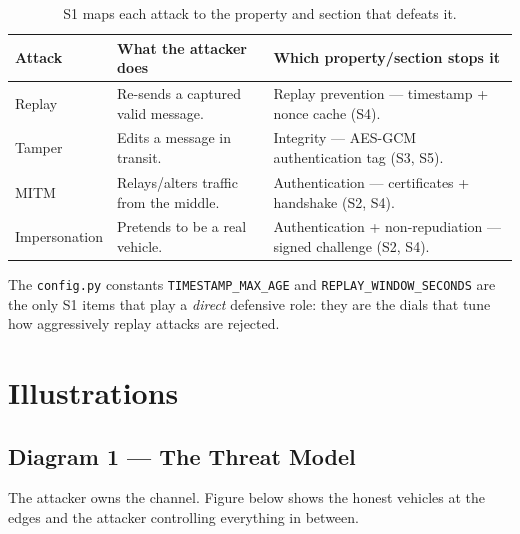 \documentclass[11pt,a4paper]{article}
\begin{document}
\begin{table}[h]
\centering
\small
\begin{tabular}{@{}p{2.6cm} p{5.6cm} p{5.3cm}@{}}
\toprule
\textbf{Attack} & \textbf{What the attacker does} & \textbf{Which property/section stops it}\\
\midrule
Replay & Re-sends a captured valid message. &
Replay prevention --- timestamp + nonce cache (S4).\\
Tamper & Edits a message in transit. &
Integrity --- AES-GCM authentication tag (S3, S5).\\
MITM & Relays/alters traffic from the middle. &
Authentication --- certificates + handshake (S2, S4).\\
Impersonation & Pretends to be a real vehicle. &
Authentication + non-repudiation --- signed challenge (S2, S4).\\
\bottomrule
\end{tabular}
\caption{S1 maps each attack to the property and section that defeats it.}
\end{table}

\noindent The \texttt{config.py} constants \texttt{TIMESTAMP\_MAX\_AGE} and
\texttt{REPLAY\_WINDOW\_SECONDS} are the only S1 items that play a \emph{direct}
defensive role: they are the dials that tune how aggressively replay attacks are
rejected.

\section{Illustrations}

\subsection{Diagram 1 --- The Threat Model}
The attacker owns the channel. Figure below shows the honest vehicles at the
edges and the attacker controlling everything in between.

\begin{center}
\end{center}
\end{document}

